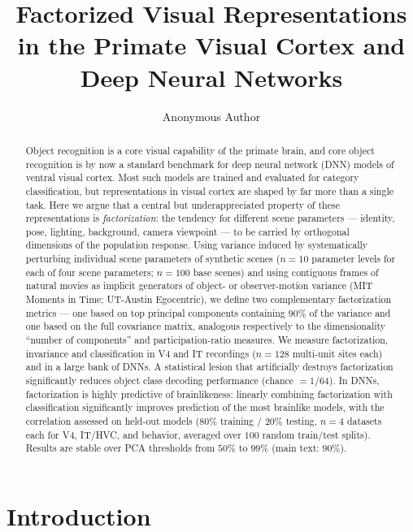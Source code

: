 \documentclass[11pt]{article}
\title{Factorized Visual Representations in the Primate Visual Cortex and Deep Neural Networks}
\author[1]{Anonymous Author}
\affil[1]{Anonymous Institution}
\date{}
\begin{document}
\maketitle

\begin{abstract}
Object recognition is a core visual capability of the primate brain, and core object recognition is by now a standard benchmark for deep neural network (DNN) models of ventral visual cortex. Most such models are trained and evaluated for category classification, but representations in visual cortex are shaped by far more than a single task. Here we argue that a central but underappreciated property of these representations is \emph{factorization}: the tendency for different scene parameters --- identity, pose, lighting, background, camera viewpoint --- to be carried by orthogonal dimensions of the population response. Using variance induced by systematically perturbing individual scene parameters of synthetic scenes ($n=10$ parameter levels for each of four scene parameters; $n=100$ base scenes) and using contiguous frames of natural movies as implicit generators of object- or observer-motion variance (MIT Moments in Time; UT-Austin Egocentric), we define two complementary factorization metrics --- one based on top principal components containing $90\%$ of the variance and one based on the full covariance matrix, analogous respectively to the dimensionality ``number of components'' and participation-ratio measures. We measure factorization, invariance and classification in V4 and IT recordings ($n=128$ multi-unit sites each) and in a large bank of DNNs. A statistical lesion that artificially destroys factorization significantly reduces object class decoding performance (chance $=1/64$). In DNNs, factorization is highly predictive of brainlikeness: linearly combining factorization with classification significantly improves prediction of the most brainlike models, with the correlation assessed on held-out models ($80\%$ training / $20\%$ testing, $n=4$ datasets each for V4, IT/HVC, and behavior, averaged over $100$ random train/test splits). Results are stable over PCA thresholds from $50\%$ to $99\%$ (main text: $90\%$).
\end{abstract}

\section{Introduction}
\end{document}
